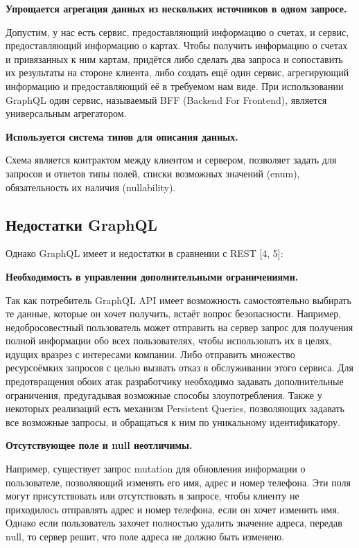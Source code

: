 \textbf{Упрощается агрегация данных из нескольких источников в одном запросе.}

Допустим, у нас есть сервис, предоставляющий информацию о счетах, и сервис, предоставляющий информацию о картах.
Чтобы получить информацию о счетах и привязанных к ним картам, придётся либо сделать два запроса и сопоставить их результаты на стороне клиента, либо создать ещё один сервис, агрегирующий информацию и предоставляющий её в требуемом нам виде.
При использовании GraphQL один сервис, называемый BFF (Backend For Frontend), является универсальным агрегатором.

\textbf{Используется система типов для описания данных.}

Схема является контрактом между клиентом и сервером, позволяет задать для запросов и ответов типы полей, списки возможных значений (enum), обязательность их наличия (nullability).

\subsection{Недостатки GraphQL}\label{subsec:graphql-disadvantages}

Однако GraphQL имеет и недостатки в сравнении с REST [4, 5]:

\textbf{Необходимость в управлении дополнительными ограничениями.}

Так как потребитель GraphQL API имеет возможность самостоятельно выбирать те данные, которые он хочет получить, встаёт вопрос безопасности.
Например, недобросовестный пользователь может отправить на сервер запрос для получения полной информации обо всех пользователях, чтобы использовать их в целях, идущих вразрез с интересами компании.
Либо отправить множество ресурсоёмких запросов с целью вызвать отказ в обслуживании этого сервиса.
Для предотвращения обоих атак разработчику необходимо задавать дополнительные ограничения, предугадывая возможные способы злоупотребления.
Также у некоторых реализаций есть механизм Persistent Queries, позволяющих задавать все возможные запросы, и обращаться к ним по уникальному идентификатору.

\textbf{Отсутствующее поле и null неотличимы.}

Например, существует запрос mutation для обновления информации о пользователе, позволяющий изменять его имя, адрес и номер телефона.
Эти поля могут присутствовать или отсутствовать в запросе, чтобы клиенту не приходилось отправлять адрес и номер телефона, если он хочет изменить имя.
Однако если пользователь захочет полностью удалить значение адреса, передав null, то сервер решит, что поле адреса не должно быть изменено.

